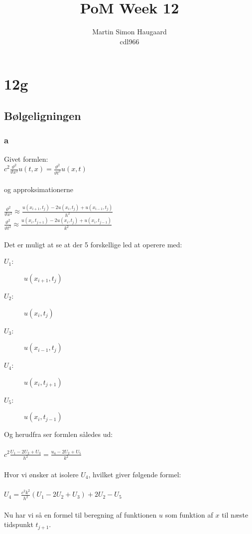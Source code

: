 \documentclass[11pt]{article} %
\title{PoM Week 12}
\author{Martin Simon Haugaard\\cdl966}
\begin{document}
\maketitle

\section*{12g}
\subsection{Bølgeligningen}
\subsubsection*{a}
Givet formlen:\\
$c^2 \frac{\vartheta^2}{\vartheta x^2}u(t,x) = \frac{\vartheta^2}{\vartheta t^2}u(x,t)$\\
\\
og approksimationerne\\
\\
$\frac{\vartheta^2}{\vartheta x^2} \approx \frac{u(x_{i+1}, t_j) - 2u(x_i, t_j) + u(x_{i-1}, t_j)}{h^2} $
\\
$\frac{\vartheta^2}{\vartheta t^2} \approx \frac{u(x_i, t_{j+1}) - 2u(x_i, t_j) + u(x_i, t_{j-1})}{k^2} $\\
\\
Det er muligt at se at der 5 forskellige led at operere med:
\begin{description}
\item[$U_1$:]{$u(x_{i+1}, t_j)$}
\item[$U_2$:]{$u(x_i, t_j)$}
\item[$U_3$:]{$u(x_{i-1}, t_j)$}
\item[$U_4$:]{$u(x_i, t_{j+1})$}
\item[$U_5$:]{$u(x_i, t_{j-1})$}
\end{description}
Og herudfra ser formlen således ud:\\
\\
$c^2\frac{U_1 - 2 U_2 + U_3}{h^2}=\frac{u_4 - 2 U_2 + U_5}{k^2}$\\
\\
Hvor vi ønsker at isolere $U_4$, hvilket giver følgende formel:\\
\\
$U_4 = \frac{c^2 k^2}{h^2}(U_1 - 2 U_2 + U_3) + 2 U_2 - U_5$\\
\\
Nu har vi så en formel til beregning af funktionen $u$ som funktion af $x$ til næste tidspunkt $t_{j+1}$.
\newpage
\end{document}
